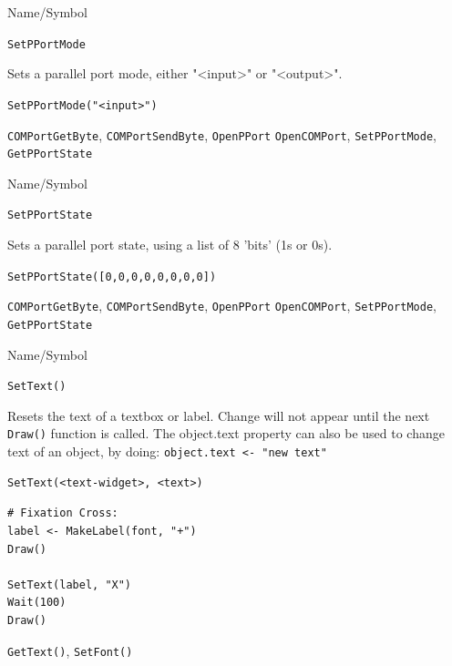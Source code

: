 \begin{desc}{Name/Symbol}
\item[Name/Symbol] \verb+SetPPortMode+ 

\item[Description]  
  Sets a parallel port mode, either "<input>" or "<output>".
  
\item[Usage]       
     \verb+SetPPortMode("<input>")+ 
\item[Example]

\item[See Also]
\verb+COMPortGetByte+, \verb+COMPortSendByte+, \verb+OpenPPort+ \verb+OpenCOMPort+, \verb+SetPPortMode+, \verb+GetPPortState+ 
\end{desc} 

\begin{desc}{Name/Symbol}
\item[Name/Symbol] \verb+SetPPortState+ 

\item[Description]  
  Sets a parallel port state, using a list of 8 'bits' (1s or 0s).
  
\item[Usage]       
     \verb+SetPPortState([0,0,0,0,0,0,0,0])+ 
\item[Example]


\item[See Also]
\verb+COMPortGetByte+, \verb+COMPortSendByte+, \verb+OpenPPort+ \verb+OpenCOMPort+, \verb+SetPPortMode+, \verb+GetPPortState+ 
\end{desc} 



\begin{desc}{Name/Symbol}

\item[Name/Symbol] 	\verb+SetText()+

\item[Description] 	Resets the text of a textbox or label.  Change will not
		appear until the next \verb+Draw()+ function is called.  The
object.text property can also be used to change text of an object, by
doing: \verb+object.text <- "new text"+

\item[Usage]
\begin{verbatim}
SetText(<text-widget>, <text>)
\end{verbatim}

\item[Example]
\begin{verbatim}
# Fixation Cross:
label <- MakeLabel(font, "+")
Draw()

SetText(label, "X")
Wait(100)
Draw()
\end{verbatim}

\item[See Also]    	\verb+GetText()+, \verb+SetFont()+
\end{desc}

